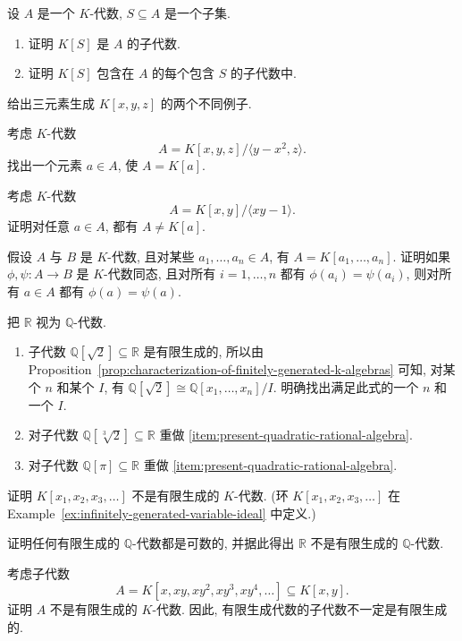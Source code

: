 \BookExerciseHeading
\begin{BookExercises}
  \item\label{ex:generated-subalgebra-is-smallest} 设 $A$ 是一个 $K$-代数, $S\subseteq A$ 是一个子集.
    \begin{enumerate}[label=(\alph*)]
      \item 证明 $K[S]$ 是 $A$ 的子代数.
      \item 证明 $K[S]$ 包含在 $A$ 的每个包含 $S$ 的子代数中.
    \end{enumerate}
  \item\label{ex:two-generating-sets-of-polynomial-algebra} 给出三元素生成 $K[x,y,z]$ 的两个不同例子.
  \item\label{ex:one-generator-for-parabola-quotient} 考虑 $K$-代数
    \[
      A=K[x,y,z]/\langle y-x^{2},z\rangle.
    \]
    找出一个元素 $a\in A$, 使 $A=K[a]$.
  \item\label{ex:hyperbola-quotient-needs-two-generators} 考虑 $K$-代数
    \[
      A=K[x,y]/\langle xy-1\rangle.
    \]
    证明对任意 $a\in A$, 都有 $A\ne K[a]$.
  \item\label{ex:algebra-maps-agree-on-generators} 假设 $A$ 与 $B$ 是 $K$-代数, 且对某些 $a_{1},\ldots,a_{n}\in A$, 有 $A=K[a_{1},\ldots,a_{n}]$. 证明如果 $\phi,\psi:A\to B$ 是 $K$-代数同态, 且对所有 $i=1,\ldots,n$ 都有 $\phi(a_{i})=\psi(a_{i})$, 则对所有 $a\in A$ 都有 $\phi(a)=\psi(a)$.
  \item\label{ex:presentations-of-rational-subalgebras} 把 $\mathbb{R}$ 视为 $\mathbb{Q}$-代数.
    \begin{enumerate}[label=(\alph*),ref=(\alph*)]
      \item\label{item:present-quadratic-rational-algebra} 子代数 $\mathbb{Q}[\sqrt{2}]\subseteq\mathbb{R}$ 是有限生成的, 所以由 Proposition~\ref{prop:characterization-of-finitely-generated-k-algebras} 可知, 对某个 $n$ 和某个 $I$, 有 $\mathbb{Q}[\sqrt{2}]\cong\mathbb{Q}[x_{1},\ldots,x_{n}]/I$. 明确找出满足此式的一个 $n$ 和一个 $I$.
      \item 对子代数 $\mathbb{Q}[\sqrt[3]{2}]\subseteq\mathbb{R}$ 重做 \ref{item:present-quadratic-rational-algebra}.
      \item 对子代数 $\mathbb{Q}[\pi]\subseteq\mathbb{R}$ 重做 \ref{item:present-quadratic-rational-algebra}.
    \end{enumerate}
  \item\label{ex:infinite-variable-polynomial-algebra-not-finite} 证明 $K[x_{1},x_{2},x_{3},\ldots]$ 不是有限生成的 $K$-代数. (环 $K[x_{1},x_{2},x_{3},\ldots]$ 在 Example~\ref{ex:infinitely-generated-variable-ideal} 中定义.)
  \item\label{ex:finite-type-over-q-countable} 证明任何有限生成的 $\mathbb{Q}$-代数都是可数的, 并据此得出 $\mathbb{R}$ 不是有限生成的 $\mathbb{Q}$-代数.
  \item\label{ex:subalgebra-not-finitely-generated} 考虑子代数
    \[
      A=K[x,xy,xy^{2},xy^{3},xy^{4},\ldots]\subseteq K[x,y].
    \]
    证明 $A$ 不是有限生成的 $K$-代数. 因此, 有限生成代数的子代数不一定是有限生成的.
\end{BookExercises}
